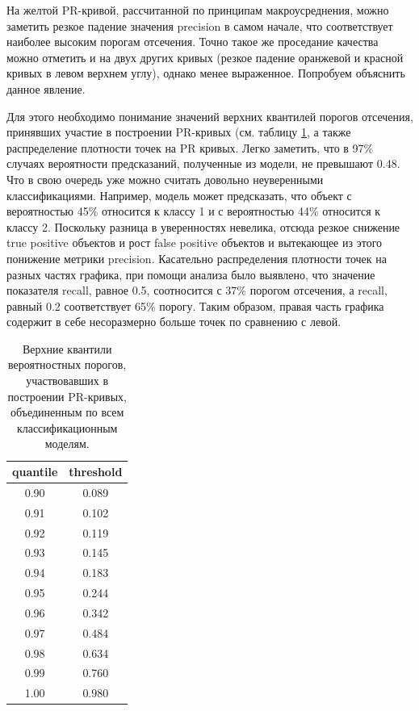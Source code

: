 \documentclass[a4paper,12pt]{extarticle}
\begin{document}
На желтой PR-кривой, рассчитанной по принципам макроусреднения, можно заметить резкое падение значения precision в самом начале, что соответствует наиболее высоким порогам отсечения. Точно такое же проседание качества можно отметить и на двух других кривых (резкое падение оранжевой и красной кривых в левом верхнем углу), однако менее выраженное. Попробуем объяснить данное явление.

Для этого необходимо понимание значений верхних квантилей порогов отсечения, принявших участие в построении PR-кривых (см. таблицу \ref{table:quantile_prcurve_general}, а также распределение плотности точек на PR кривых. Легко заметить, что в 97\% случаях вероятности предсказаний, полученные из модели, не превышают 0.48. Что в свою очередь уже можно считать довольно неуверенными классификациями. Например, модель может предсказать, что объект с вероятностью 45\% относится к классу 1 и с вероятностью 44\% относится к классу 2. Поскольку разница в уверенностях невелика, отсюда резкое снижение true positive объектов и рост false positive объектов и вытекающее из этого понижение метрики precision. Касательно распределения плотности точек на разных частях графика, при помощи анализа было выявлено, что значение показателя recall, равное 0.5, соотносится с 37\% порогом отсечения, а recall, равный 0.2 соответствует 65\% порогу. Таким образом, правая часть графика содержит в себе несоразмерно больше точек по сравнению с левой.

\begin{table}[ht]
	\caption{Верхние квантили вероятностных порогов, участвовавших в построении PR-кривых, объединенным по всем классификационным моделям.}
	\label{table:quantile_prcurve_general}
	\footnotesize
	\centering
	\begin{tabular}{cc}
		\toprule
		\multicolumn{1}{c}{quantile} & \multicolumn{1}{c}{threshold}\\
		\midrule
		0.90 & 0.089\\
		0.91 & 0.102\\
		0.92 & 0.119\\
		0.93 & 0.145\\
		0.94 & 0.183\\
		0.95 & 0.244\\
		0.96 & 0.342\\
		0.97 & 0.484\\
		0.98 & 0.634\\
		0.99 & 0.760\\
		1.00 & 0.980\\
		\bottomrule
	\end{tabular}
\end{table}
\end{document}
